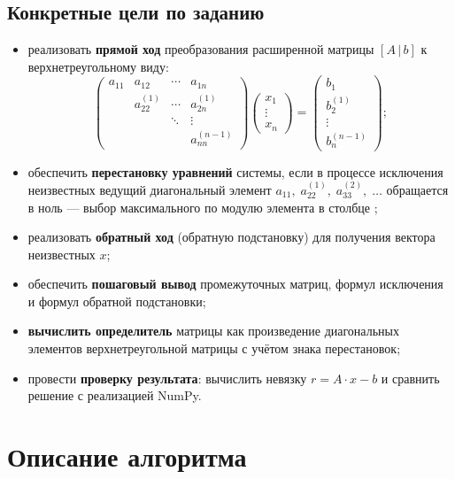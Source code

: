 \documentclass[a4paper,12pt]{article}
\begin{document}
\subsection*{Конкретные цели по заданию}
\begin{itemize}
    \item реализовать \textbf{прямой ход} преобразования расширенной матрицы $[A\,|\,b]$ к верхнетреугольному виду:
    \[
        \begin{pmatrix}
            a_{11} & a_{12} & \cdots & a_{1n} \\
                   & a_{22}^{(1)} & \cdots & a_{2n}^{(1)} \\
                   &        & \ddots & \vdots \\
                   &        &        & a_{nn}^{(n-1)}
        \end{pmatrix}
        \begin{pmatrix}x_1\\\vdots\\x_n\end{pmatrix}
        =
        \begin{pmatrix}b_1\\b_2^{(1)}\\\vdots\\b_n^{(n-1)}\end{pmatrix};
    \]
    \item обеспечить \textbf{перестановку уравнений} системы, если в процессе исключения неизвестных ведущий диагональный элемент
    $a_{11},\; a_{22}^{(1)},\; a_{33}^{(2)},\;\ldots$ обращается в ноль --- выбор максимального по модулю элемента в столбце ;
    \item реализовать \textbf{обратный ход} (обратную подстановку) для получения вектора неизвестных $x$;
    \item обеспечить \textbf{пошаговый вывод} промежуточных матриц, формул исключения и формул обратной подстановки;
    \item \textbf{вычислить определитель} матрицы как произведение диагональных элементов верхнетреугольной матрицы с учётом знака перестановок;
    \item провести \textbf{проверку результата}: вычислить невязку $r = A\cdot x - b$ и сравнить решение с реализацией NumPy.
\end{itemize}

\newpage

\section{Описание алгоритма}
\end{document}
